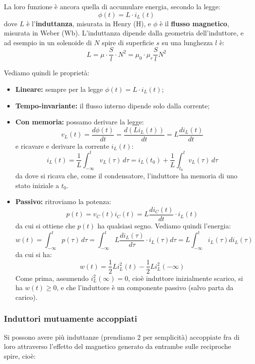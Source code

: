 \documentclass[a4paper,11pt]{article}
\begin{document}
La loro funzione è ancora quella di accumulare energia, secondo la legge:
$$
\phi(t) = L \cdot i_L (t)
$$
dove $L$ è l'\textbf{induttanza}, misurata in Henry ($\mathrm{H}$), e $\phi$ è il \textbf{flusso magnetico}, misurata in Weber ($\mathrm{Wb}$).
L'induttanza dipende dalla geometria dell'induttore, e ad esempio in un solenoide di $N$ spire di superficie $s$ su una lunghezza $l$ è:
$$ 
L = \mu \cdot \frac{S}{l} \cdot N^2 = \mu_0 \cdot \mu_r \frac{S}{l} N^2
$$

Vediamo quindi le proprietà:
\begin{itemize}
	\item \textbf{Lineare:} sempre per la legge $\phi(t) = L \cdot i_L (t)$;
	\item \textbf{Tempo-invariante:} il flusso interno dipende solo dalla corrente;
	\item \textbf{Con memoria:} possamo derivare la legge:
		$$ 
			v_L (t) = \frac{d \phi(t)}{dt} = \frac{d (L i_L(t))}{dt} = L\frac{d i_L(t)}{dt}
		$$
		e ricavare e derivare la corrente $i_L(t)$:
		$$
		i_L(t) = \frac{1}{L} \int_{-\infty}^t v_L (\tau) \, d\tau = i_L(t_0) + \frac{1}{L} \int_{t_0}^{t} v_L(\tau) \, d\tau
		$$
		da dove si ricava che, come il condensatore, l'induttore ha memoria di uno stato iniziale a $t_0$.
	\item \textbf{Passivo:} ritroviamo la potenza:
		$$
			p(t) = v_C(t) i_C(t) = L \frac{d i_C(t)}{dt} \cdot i_L(t)
		$$
		da cui si ottiene che $p(t)$ ha qualsiasi segno. Vediamo quindi l'energia:
		$$
		w(t) = \int_{-\infty}^{t} p(\tau) \, d \tau = \int_{-\infty}^{t} L \frac{d i_L(\tau)}{d\tau} \cdot i_L(\tau) d\tau = L \int_{-\infty}^t i_L(\tau) d i_L(\tau)
		$$
		da cui si ha:
		$$
		w(t) = \frac{1}{2} L i_L^2(t) - \frac{1}{2} L i_L^2 (-\infty)
		$$
		Come prima, assumendo $i_L^2(\infty) = 0$, cioè induttore inizialmente scarico, si ha $w(t) \geq 0$, e che l'induttore è un componente passivo (salvo parta da carico).
\end{itemize}

\subsubsection{Induttori mutuamente accoppiati}
Si possono avere più induttanze (prendiamo 2 per semplicità) accoppiate fra di loro attraverso l'effetto del magnetico generato da entrambe sulle reciproche spire, cioè:
\end{document}
